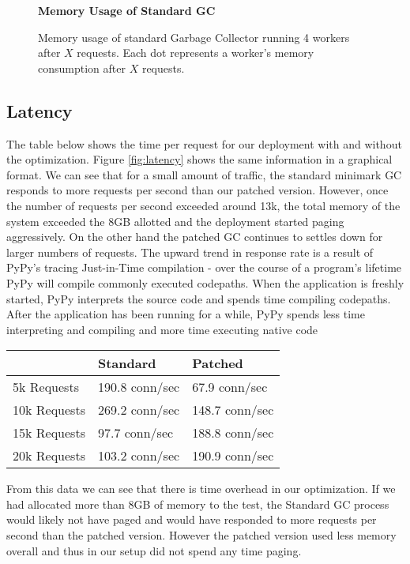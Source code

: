 \documentclass{article}
\begin{document}
\begin{sloppypar}
\begin{figure}
    \begin{center}\textbf{Memory Usage of Standard GC}\end{center}
    \resizebox{0.5\textwidth}{!}{}
    \caption{Memory usage of standard Garbage Collector running 4 workers after $X$ requests.  Each dot represents a worker's memory consumption after $X$ requests.}\label{fig:standard_mem}
\end{figure}

\subsection{Latency}

The table below shows the time per request for our deployment with and without the optimization.  Figure \ref{fig:latency} shows the same information in a graphical format.  We can see that for a small amount of traffic, the standard minimark GC responds to more requests per second than our patched version.  However, once the number of requests per second exceeded around 13k, the total memory of the system exceeded the 8GB allotted and the deployment started paging aggressively.  On the other hand the patched GC continues to settles down for larger numbers of requests.  The upward trend in response rate is a result of PyPy's tracing Just-in-Time compilation - over the course of a program's lifetime PyPy will compile commonly executed codepaths.  When the application is freshly started, PyPy interprets the source code and spends time compiling codepaths.  After the application has been running for a while, PyPy spends less time interpreting and compiling and more time executing native code \cite{pypy-doc}

\begin{center}
\begin{tabular}{| l || l | l |}
    \hline
     & \textbf{Standard} & \textbf{Patched} \\
    \hline
    5k Requests & 190.8 conn/sec & 67.9 conn/sec \\
    10k Requests & 269.2 conn/sec & 148.7 conn/sec \\
    15k Requests & 97.7 conn/sec & 188.8 conn/sec \\
    20k Requests & 103.2 conn/sec & 190.9 conn/sec \\
    \hline
\end{tabular}
\end{center}

From this data we can see that there is time overhead in our optimization.  If we had allocated more than 8GB of memory to the test, the Standard GC process would likely not have paged and would have responded to more requests per second than the patched version.  However the patched version used less memory overall and thus in our setup did not spend any time paging.  


\end{sloppypar}
\end{document}
